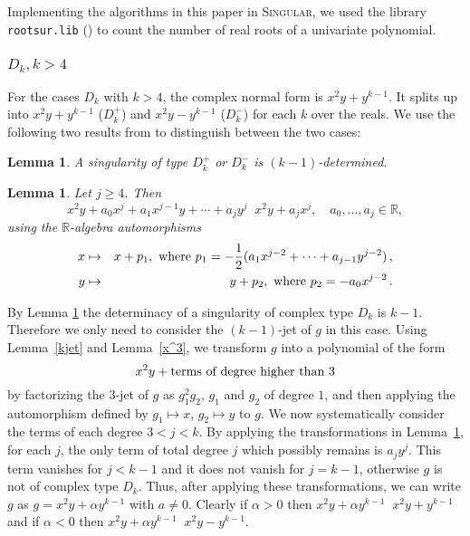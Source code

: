 \documentclass[noend]{amsproc}
\newtheorem{lemma}[theorem]{Lemma}
\theoremstyle{definition}
\DeclareMathOperator{\requiv}{\overset{r}{\sim}}
\begin{document}
Implementing the algorithms in this paper in \textsc{Singular}, we used the
library \texttt{rootsur.lib} (\cite{roots}) to count the number of real roots
of a univariate polynomial.

\subsubsection{$D_k, k > 4$}

For the cases $D_k$ with $k > 4$, the complex normal form is $x^2y+y^{k-1}$. It
splits up into $x^2y+y^{k-1}$ ($D_k^+$) and $x^2y-y^{k-1}$ ($D_k^-$) for each
$k$ over the reals. We use the following two results from \cite{Siersma} to
distinguish between the two cases:

\begin{lemma}\label{kDeterminacyD[k]k>4}
A singularity of type $D_k^+$ or $D_k^-$ is $(k-1)$-determined.
\end{lemma}

\begin{lemma}\label{transformationD[k]}
Let $j\ge 4$. Then
\[
x^2y+a_0x^j+a_1x^{j-1}y+\cdots+a_jy^j\requiv x^2y+a_jx^j,
\quad a_0,\ldots,a_j\in\mathbb R,
\]
using the $\mathbb R$-algebra automorphisms
\begin{eqnarray*}
x&\mapsto&x+p_1,\textnormal{ where }
p_1=-\frac{1}{2}(a_1x^{j-2}+\cdots+a_{j-1}y^{j-2})\,,\\
y&\mapsto&y+p_2,\textnormal{ where } p_2=-a_0x^{j-2} \,.
\end{eqnarray*}
\end{lemma}

By Lemma \ref{kDeterminacyD[k]k>4} the determinacy of a singularity of  complex
type
$D_k$ is $k-1$. Therefore we only need to consider the
$(k-1)$-jet of $g$ in this case. Using Lemma~\ref{kjet} and Lemma~\ref{x^3}, we
transform $g$ into a polynomial of the form
\[x^2y+\textnormal{terms of degree higher than $3$}\]
by factorizing the $3$-jet of $g$ as $g_1^2g_2$, $g_1$ and $g_2$ of
degree $1$,
and then applying the automorphism defined by $g_1\mapsto x$, $g_2\mapsto y$ to
$g$. We
now systematically consider the terms of each degree $3<j<k$. By applying the
transformations in Lemma~\ref{transformationD[k]}, for each $j$, the only term
of total degree $j$ which possibly remains is $a_jy^j$. This term vanishes for
$j<k-1$ and it does not vanish for $j=k-1$, otherwise $g$ is not of complex
type $D_k$. Thus, after applying these transformations,
we can write $g$ as $g=x^2y+\alpha y^{k-1}$ with $a\neq0$. Clearly if $\alpha>0$ then
$x^2y+\alpha y^{k-1}\requiv x^2y+y^{k-1}$ and if $\alpha<0$ then
$x^2y+\alpha y^{k-1}\requiv x^2y-y^{k-1}$.
\end{document}
